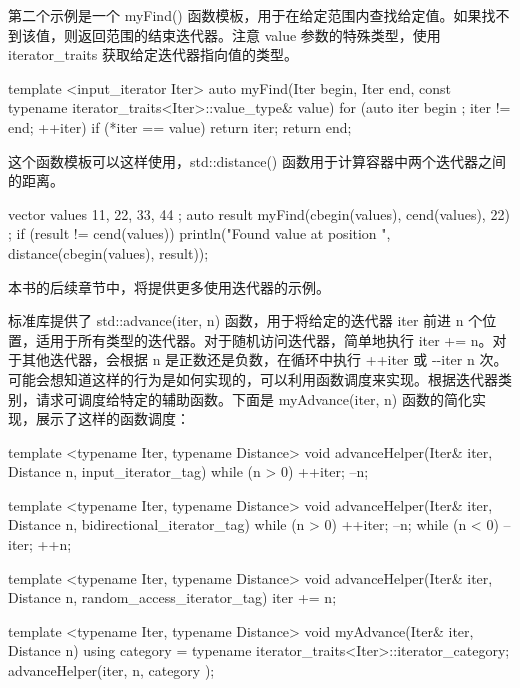 第二个示例是一个 myFind() 函数模板，用于在给定范围内查找给定值。如果找不到该值，则返回范围的结束迭代器。注意 value 参数的特殊类型，使用 iterator\_traits 获取给定迭代器指向值的类型。

\begin{cpp}
template <input_iterator Iter>
auto myFind(Iter begin, Iter end,
    const typename iterator_traits<Iter>::value_type& value)
{
    for (auto iter { begin }; iter != end; ++iter) {
        if (*iter == value) { return iter; }
    }
    return end;
}
\end{cpp}

这个函数模板可以这样使用，std::distance() 函数用于计算容器中两个迭代器之间的距离。

\begin{cpp}
vector values { 11, 22, 33, 44 };
auto result { myFind(cbegin(values), cend(values), 22) };
if (result != cend(values)) {
    println("Found value at position {}", distance(cbegin(values), result));
}
\end{cpp}

本书的后续章节中，将提供更多使用迭代器的示例。


标准库提供了 std::advance(iter, n) 函数，用于将给定的迭代器 iter 前进 n 个位置，适用于所有类型的迭代器。对于随机访问迭代器，简单地执行 iter += n。对于其他迭代器，会根据 n 是正数还是负数，在循环中执行 ++iter 或 -{}-iter n 次。可能会想知道这样的行为是如何实现的，可以利用函数调度来实现。根据迭代器类别，请求可调度给特定的辅助函数。下面是 myAdvance(iter, n) 函数的简化实现，展示了这样的函数调度：

\begin{cpp}
template <typename Iter, typename Distance>
void advanceHelper(Iter& iter, Distance n, input_iterator_tag)
{
    while (n > 0) { ++iter; --n; }
}

template <typename Iter, typename Distance>
void advanceHelper(Iter& iter, Distance n, bidirectional_iterator_tag)
{
    while (n > 0) { ++iter; --n; }
    while (n < 0) { --iter; ++n; }
}

template <typename Iter, typename Distance>
void advanceHelper(Iter& iter, Distance n, random_access_iterator_tag)
{
    iter += n;
}

template <typename Iter, typename Distance>
void myAdvance(Iter& iter, Distance n)
{
    using category = typename iterator_traits<Iter>::iterator_category;
    advanceHelper(iter, n, category {});
}
\end{cpp}

